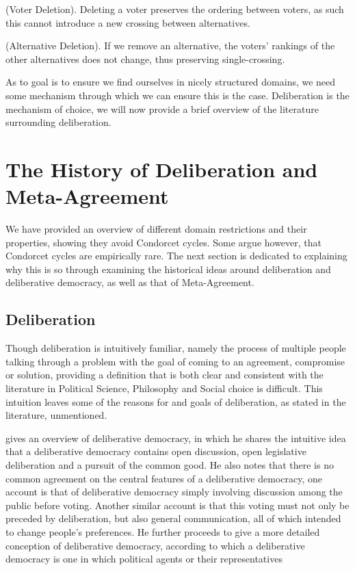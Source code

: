 \begin{proofc}
	(Voter Deletion). Deleting a voter preserves the ordering between voters, as such this cannot introduce a new crossing between alternatives.~\checkmark

	(Alternative Deletion). If we remove an alternative, the voters' rankings of the other alternatives does not change, thus preserving single-crossing.~\checkmark
\end{proofc}

As to goal is to ensure we find ourselves in nicely structured domains, we need some mechanism through which we can ensure this is the case. Deliberation is the mechanism of choice, we will now provide a brief overview of the literature surrounding deliberation.

\section{The History of Deliberation and Meta-Agreement}

We have provided an overview of different domain restrictions and their properties, showing they avoid Condorcet cycles. Some argue however, that Condorcet cycles are empirically rare. The next section is dedicated to explaining why this is so through examining the historical ideas around deliberation and deliberative democracy, as well as that of Meta-Agreement.

\subsection{Deliberation}
Though deliberation is intuitively familiar, namely the process of multiple people talking through a problem with the goal of coming to an agreement, compromise or solution, providing a definition that is both clear and consistent with the literature in Political Science, Philosophy and Social choice is difficult.  This intuition leaves some of the reasons for and goals of deliberation, as stated in the literature, unmentioned.


\citet{freemanDeliberativeDemocracySympathetic2000} gives an overview of deliberative democracy, in which he shares the intuitive idea that a deliberative democracy contains open discussion, open legislative deliberation and a pursuit of the common good. He also notes that there is no common agreement on the central features of a deliberative democracy, one account is that of deliberative democracy simply involving discussion among the public before voting. Another similar account is that this voting must not only be preceded by deliberation, but also general communication, all of which intended to change people's preferences. He further proceeds to give a more detailed conception of deliberative democracy, according to which a deliberative democracy is one in which political agents or their representatives

